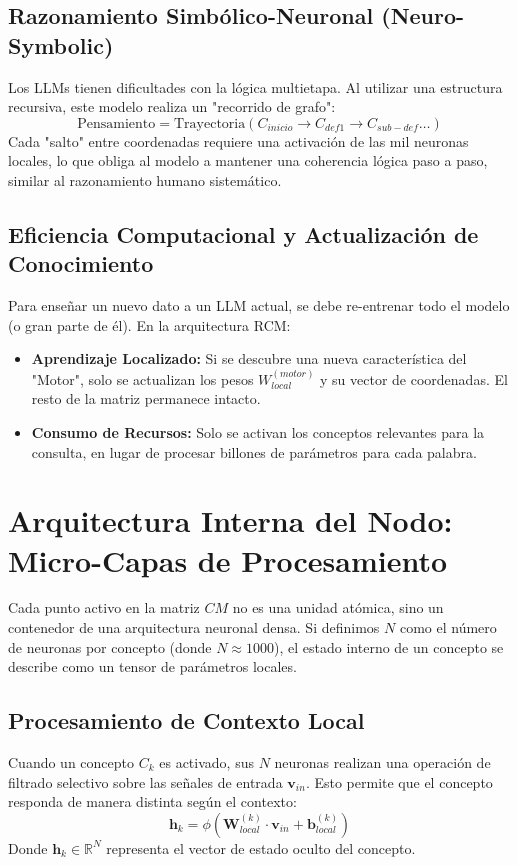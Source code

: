 \documentclass[12pt]{article}
\begin{document}
\subsection{Razonamiento Simbólico-Neuronal (Neuro-Symbolic)}
Los LLMs tienen dificultades con la lógica multietapa. Al utilizar una estructura recursiva, este modelo realiza un "recorrido de grafo":
$$ \text{Pensamiento} = \text{Trayectoria}(C_{inicio} \to C_{def1} \to C_{sub-def} \dots) $$
Cada "salto" entre coordenadas requiere una activación de las mil neuronas locales, lo que obliga al modelo a mantener una coherencia lógica paso a paso, similar al razonamiento humano sistemático.

\subsection{Eficiencia Computacional y Actualización de Conocimiento}
Para enseñar un nuevo dato a un LLM actual, se debe re-entrenar todo el modelo (o gran parte de él). En la arquitectura RCM:
\begin{itemize}
    \item \textbf{Aprendizaje Localizado:} Si se descubre una nueva característica del "Motor", solo se actualizan los pesos $W_{local}^{(motor)}$ y su vector de coordenadas. El resto de la matriz permanece intacto.
    \item \textbf{Consumo de Recursos:} Solo se activan los conceptos relevantes para la consulta, en lugar de procesar billones de parámetros para cada palabra.
\end{itemize}


\section{Arquitectura Interna del Nodo: Micro-Capas de Procesamiento}
Cada punto activo en la matriz $CM$ no es una unidad atómica, sino un contenedor de una arquitectura neuronal densa. Si definimos $N$ como el número de neuronas por concepto (donde $N \approx 1000$), el estado interno de un concepto se describe como un tensor de parámetros locales.

\subsection{Procesamiento de Contexto Local}
Cuando un concepto $C_k$ es activado, sus $N$ neuronas realizan una operación de filtrado selectivo sobre las señales de entrada $\mathbf{v}_{in}$. Esto permite que el concepto responda de manera distinta según el contexto:
$$ \mathbf{h}_k = \phi( \mathbf{W}_{local}^{(k)} \cdot \mathbf{v}_{in} + \mathbf{b}_{local}^{(k)} ) $$
Donde $\mathbf{h}_k \in \mathbb{R}^N$ representa el vector de estado oculto del concepto.
\end{document}
